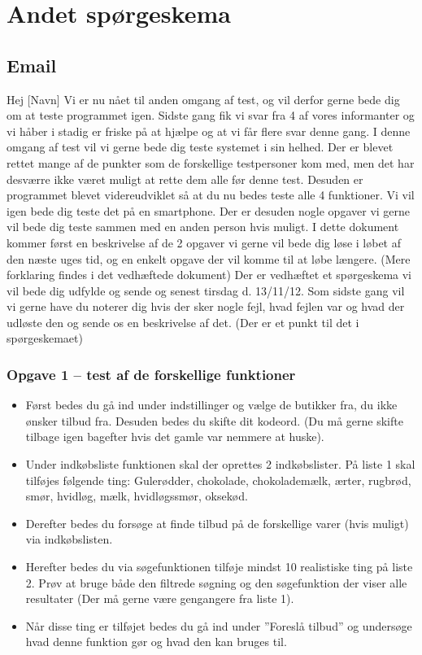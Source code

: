\chapter{Andet spørgeskema}
\label{chap:andetskema}

\section*{Email}
Hej [Navn]
Vi er nu nået til anden omgang af test, og vil derfor gerne bede dig om at teste programmet igen. Sidste gang fik vi svar fra 4 af vores informanter og vi håber i stadig er friske på at hjælpe og at vi får flere svar denne gang.
I denne omgang af test vil vi gerne bede dig teste systemet i sin helhed. Der er blevet rettet mange af de punkter som de forskellige testpersoner kom med, men det har desværre ikke været muligt at rette dem alle før denne test. Desuden er programmet blevet videreudviklet så at du nu bedes teste alle 4 funktioner.  Vi vil igen bede dig teste det på en smartphone. Der er desuden nogle opgaver vi gerne vil bede dig teste sammen med en anden person hvis muligt. 
I dette dokument kommer først en beskrivelse af de 2 opgaver vi gerne vil bede dig løse i løbet af den næste uges tid, og en enkelt opgave der vil komme til at løbe længere. (Mere forklaring findes i det vedhæftede dokument) 
Der er vedhæftet et spørgeskema vi vil bede dig udfylde og sende og senest tirsdag d. 13/11/12.
Som sidste gang vil vi gerne have du noterer dig hvis der sker nogle fejl, hvad fejlen var og hvad der udløste den og sende os en beskrivelse af det. (Der er et punkt til det i spørgeskemaet)
\subsection*{Opgave 1 – test af de forskellige funktioner}
\begin{itemize}
\item Først bedes du gå ind under indstillinger og vælge de butikker fra, du ikke ønsker tilbud fra. Desuden bedes du skifte dit kodeord. (Du må gerne skifte tilbage igen bagefter hvis det gamle var nemmere at huske).
\item Under indkøbsliste funktionen skal der oprettes 2 indkøbslister. På liste 1 skal tilføjes følgende ting:
Gulerødder, chokolade, chokolademælk, ærter, rugbrød, smør, hvidløg, mælk, hvidløgssmør, oksekød. 
\item Derefter bedes du forsøge at finde tilbud på de forskellige varer (hvis muligt) via indkøbslisten.
\item Herefter bedes du via søgefunktionen tilføje mindst 10 realistiske ting på liste 2. Prøv at bruge både den filtrede søgning og den søgefunktion der viser alle resultater (Der må gerne være gengangere fra liste 1).
\item Når disse ting er tilføjet bedes du gå ind under ”Foreslå tilbud” og undersøge hvad denne funktion gør og hvad den kan bruges til.
\end{itemize}
